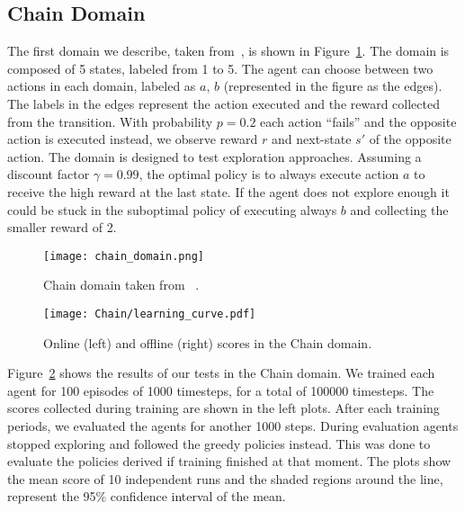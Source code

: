 \subsection{Chain Domain}
The first domain we describe, taken from~\cite{Dearden98bayesianq-learning}, is shown in Figure~\ref{fig:chain_domain}. The domain is composed of 5 states, labeled from 1 to 5. The agent can choose between two actions in each domain, labeled as $a$, $b$ (represented in the figure as the edges). The labels in the edges represent the action executed and the reward collected from the transition. With probability $p=0.2$ each action ``fails'' and the opposite action is executed instead, \ie we observe reward $r$ and next-state $s'$ of the opposite action. The domain is designed to test exploration approaches. Assuming a discount factor $\gamma=0.99$, the optimal policy is to always execute action $a$ to receive the high reward at the last state. If the agent does not explore enough it could be stuck in the suboptimal policy of executing always $b$ and collecting the smaller reward of 2.
\begin{figure}
 \texttt{[image: chain\_domain.png]}
 \caption{Chain domain taken from ~\cite{Dearden98bayesianq-learning}.}
 \label{fig:chain_domain}
\end{figure}
\begin{figure}
 \texttt{[image: Chain/learning\_curve.pdf]}
 \caption{Online (left) and offline (right) scores in the Chain domain.}
 \label{fig:chain_learning_curve}
\end{figure}
Figure~\ref{fig:chain_learning_curve} shows the results of our tests in the Chain domain. We trained each agent for 100 episodes of 1000 timesteps, for a total of 100000 timesteps. The scores collected during training are shown in the left plots. After each training periods, we evaluated the agents for another 1000 steps. During evaluation agents stopped exploring and followed the greedy policies instead. This was done to evaluate the policies derived if training finished at that moment. The plots show the mean score of 10 independent runs and the shaded regions around the line, represent the 95\% confidence interval of the mean.\par
